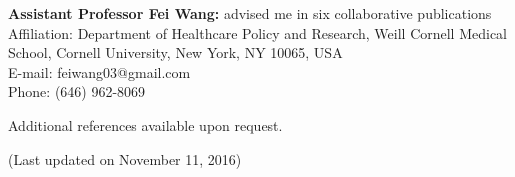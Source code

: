 \documentclass[margin, 10pt]{res}
\begin{document}
\begin{resume}
\textbf{Assistant Professor Fei Wang:} advised me in six collaborative publications \\
{Affiliation}: {Department of Healthcare Policy and Research, Weill Cornell Medical School, Cornell University, New York, NY 10065, USA} \\
{E-mail:} {feiwang03@gmail.com} \\
{Phone:} {(646) 962-8069}

Additional references available upon request.

(Last updated on November 11, 2016)
\end{resume}
\end{document}
